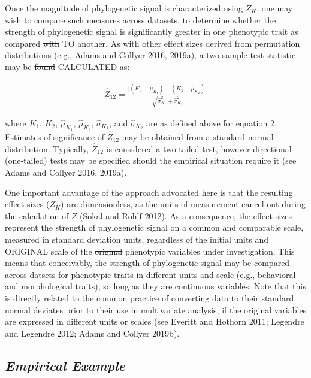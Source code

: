 \documentclass[
]{article}
\begin{document}
Once the magnitude of phylogenetic signal is characterized using
\(Z_K\), one may wish to compare such measures across datasets, to
determine whether the strength of phylogenetic signal is significantly
greater in one phenotypic trait as compared \sout{with} TO another. As
with other effect sizes derived from permutation distributions (e.g.,
Adams and Collyer 2016, 2019a), a two-sample test statistic may be
\sout{found} CALCULATED as:

\begin{align}
  \hat{Z}_{12}=\frac{\lvert{(K_{1}-\hat\mu_{K_1})-(K_{2}-\hat\mu_{K_2})}\rvert}{\sqrt{\hat\sigma^2_{K_1}+\hat\sigma^2_{K_2}}}
\end{align}

where \(K_1\), \(K_2\), \(\hat\mu_{K_1}\), \(\hat\mu_{K_2}\),
\(\hat\sigma_{K_1}\), and \(\hat\sigma_{K_2}\) are as defined above for
equation 2. Estimates of significance of \(\hat{Z}_{12}\) may be
obtained from a standard normal distribution. Typically,
\(\hat{Z}_{12}\) is considered a two-tailed test, however directional
(one-tailed) tests may be specified should the empirical situation
require it (see Adams and Collyer 2016, 2019a). \hfill\break

One important advantage of the approach advocated here is that the
resulting effect sizes (\(Z_K\)) are dimensionless, as the units of
measurement cancel out during the calculation of \(Z\) (Sokal and Rohlf
2012). As a consequence, the effect sizes represent the strength of
phylogenetic signal on a common and comparable scale, measured in
standard deviation units, regardless of the initial units and ORIGINAL
scale of the \sout{original} phenotypic variables under investigation.
This means that conceivably, the strength of phylogenetic signal may be
compared across datsets for phenotypic traits in different units and
scale (e.g., behavioral and morphological traits), so long as they are
continuous variables. Note that this is directly related to the common
practice of converting data to their standard normal deviates prior to
their use in multivariate analysis, if the original variables are
expressed in different units or scales (see Everitt and Hothorn 2011;
Legendre and Legendre 2012; Adams and Collyer 2019b).

\hypertarget{empirical-example}{%
\subsection{\texorpdfstring{\emph{Empirical
Example}}{Empirical Example}}\label{empirical-example}}
\end{document}
